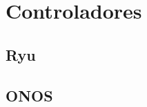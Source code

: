 \section{Controladores }
\label{sec:sdnControllers}

\subsection{Ryu}
\label{subsec:ryu}

\subsection{ONOS}
\label{subsec:ONOS}